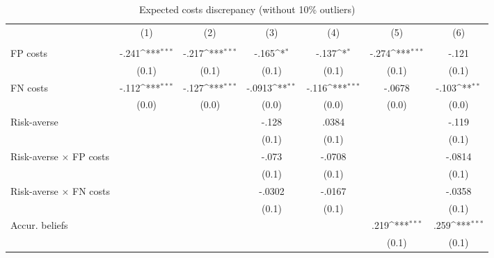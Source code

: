 \begin{table}[htbp]\centering
\def\sym#1{\ifmmode^{#1}\else\(^{#1}\)\fi}
\caption{Expected costs discrepancy (without 10\% outliers)}
\begin{tabular}{l*{6}{c}}
\hline\hline
                &\multicolumn{1}{c}{(1)}&\multicolumn{1}{c}{(2)}&\multicolumn{1}{c}{(3)}&\multicolumn{1}{c}{(4)}&\multicolumn{1}{c}{(5)}&\multicolumn{1}{c}{(6)}\\
                &\multicolumn{1}{c}{}&\multicolumn{1}{c}{}&\multicolumn{1}{c}{}&\multicolumn{1}{c}{}&\multicolumn{1}{c}{}&\multicolumn{1}{c}{}\\
\hline
FP costs        &    -.241\sym{***}&    -.217\sym{***}&    -.165\sym{*}  &    -.137\sym{*}  &    -.274\sym{***}&    -.121         \\
                &    (0.1)         &    (0.1)         &    (0.1)         &    (0.1)         &    (0.1)         &    (0.1)         \\
FN costs        &    -.112\sym{***}&    -.127\sym{***}&   -.0913\sym{**} &    -.116\sym{***}&   -.0678         &    -.103\sym{**} \\
                &    (0.0)         &    (0.0)         &    (0.0)         &    (0.0)         &    (0.0)         &    (0.0)         \\
Risk-averse     &                  &                  &    -.128         &    .0384         &                  &    -.119         \\
                &                  &                  &    (0.1)         &    (0.1)         &                  &    (0.1)         \\
Risk-averse $\times$ FP costs&                  &                  &    -.073         &   -.0708         &                  &   -.0814         \\
                &                  &                  &    (0.1)         &    (0.1)         &                  &    (0.1)         \\
Risk-averse $\times$ FN costs&                  &                  &   -.0302         &   -.0167         &                  &   -.0358         \\
                &                  &                  &    (0.1)         &    (0.1)         &                  &    (0.1)         \\
Accur. beliefs  &                  &                  &                  &                  &     .219\sym{***}&     .259\sym{***}\\
                &                  &                  &                  &                  &    (0.1)         &    (0.1)         \\

\end{tabular}
\end{table}
